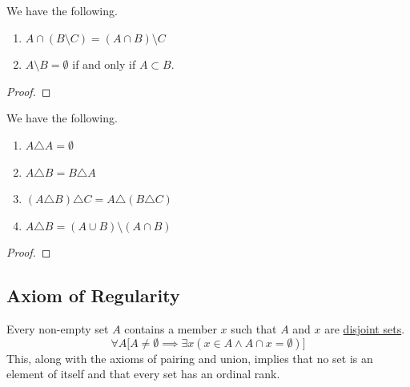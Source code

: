   \begin{theorem}
    \label{thm:properties-of-set-difference}
    We have the following. 
    \begin{enumerate}
      \item $A \cap (B \setminus C) = (A \cap B) \setminus C$ 
      \item $A \setminus B = \emptyset$ if and only if $A \subset B$. 
    \end{enumerate}
  \end{theorem}
  \begin{proof}
    
  \end{proof} 

  \begin{theorem}
    \label{thm:properties-of-symmetric-difference}
    We have the following. 
    \begin{enumerate}
      \item $A \triangle A = \emptyset$
      \item $A \triangle B = B \triangle A$
      \item $(A \triangle B) \triangle C = A \triangle (B \triangle C)$
      \item $A \triangle B = (A \cup B) \setminus (A \cap B)$
    \end{enumerate}
  \end{theorem}
  \begin{proof}
    
  \end{proof} 

\subsection{Axiom of Regularity} 

  \begin{axiom}
    \label{thm:axiom-of-regularity}
    Every non-empty set $A$ contains a member $x$ such that $A$ and $x$ are \hyperref[def:disjoint-sets]{disjoint sets}. 
    \begin{equation}
      \forall A \big[ A \neq \emptyset \implies \exists x (x \in A \land A \cap x = \emptyset) \big]
    \end{equation}
    This, along with the axioms of pairing and union, implies that no set is an element of itself and that every set has an ordinal rank. 
  \end{axiom}

